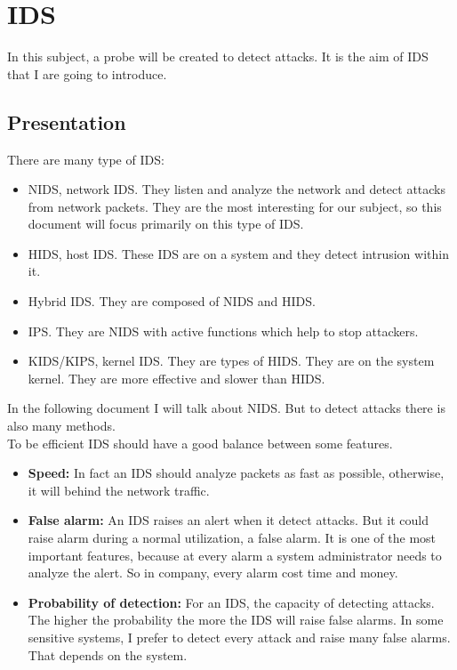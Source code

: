 \chapter{IDS}

In this subject, a probe will be created to detect attacks. It is the aim of IDS that I are going to introduce.

\section{Presentation}




There are many type of IDS:
\begin{itemize}[itemsep=0pt]
\item NIDS, network IDS. They listen and analyze the network and detect attacks from network packets. They are the
  most interesting for our subject, so this document will focus primarily on this type of IDS.
\item HIDS, host IDS. These IDS are on a system and they detect intrusion within it.
\item Hybrid IDS. They are composed of NIDS and HIDS.
\item IPS. They are NIDS with active functions which help to stop attackers.
\item KIDS/KIPS, kernel IDS. They are types of HIDS. They are on the system kernel. They are more effective and
slower than HIDS.
\end{itemize}

In the following document I will talk about NIDS. But to detect attacks there is also many methods.
~\\


To be efficient IDS should have a good balance between some features.
\begin{itemize}[itemsep=0pt]
\item \textbf{Speed:} In fact an IDS should analyze packets as fast as possible, otherwise, it will behind the network
  traffic.
\item \textbf{False alarm:} An IDS raises an alert when it detect attacks. But it could raise alarm during a normal
  utilization, a false alarm. It is one of the most important features, because at every alarm a system
  administrator needs to analyze the alert. So in company, every alarm cost time and money.
\item \textbf{Probability of detection:} For an IDS, the capacity of detecting attacks. The higher the probability
  the more the IDS will raise false alarms. In some sensitive systems, I prefer to detect every attack and raise
  many false alarms. That depends on the system.
\end{itemize}


